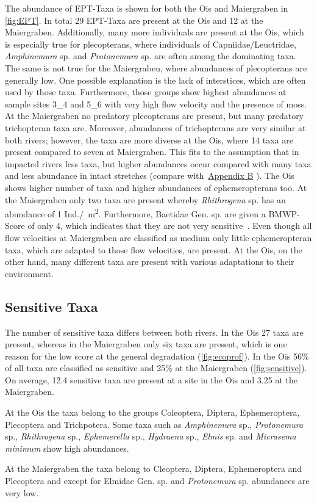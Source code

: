 The abundance of EPT-Taxa is shown for both the Ois and Maiergraben in \cref{fig:EPT}. In total 29 EPT-Taxa are present at the Ois and 12 at the Maiergraben. Additionally, many more individuals are present at the Ois, which is especially true for plecopterans, where individuals of Capniidae/Leuctridae, \emph{Amphinemura} sp. and \emph{Protonemura} sp. are often among the dominating taxa. The same is not true for the Maiergraben, where abundances of plecopterans are generally low. One possible explanation is the lack of interstices, which are often used by those taxa. Furthermore, those groups show highest abundances at sample sites 3\_4 and 5\_6 with very high flow velocity and the presence of moss. At the Maiergraben no predatory plecopterans are present, but many predatory trichopteran taxa are. Moreover, abundances of trichopterans are very similar at both rivers; however, the taxa are more diverse at the Ois, where 14 taxa are present compared to seven at Maiergraben. This fits to the assumption that in impacted rivers less taxa, but higher abundances occur compared with many taxa and less abundance in intact stretches (compare with~\hyperref[appendixB]{Appendix B} ). The Ois shows higher number of taxa and higher abundances of ephemeropterans too. At the Maiergraben only two taxa are present whereby \emph{Rhithrogena} sp. has an abundance of 1 Ind./\SI{}{\square\meter}. Furthermore, Baetidae Gen. sp. are given a BMWP-Score of only 4, which indicates that they are not very sensitive~. Even though all flow velocities at Maiergraben are classified as medium only little ephemeropteran taxa, which are adapted to those flow velocities, are present. At the Ois, on the other hand, many different taxa are present with various adaptations to their environment.



\subsection{Sensitive Taxa}\label{sec:disc_sensitive_taxa}          %

The number of sensitive taxa differs between both rivers. In the Ois 27 taxa are present, whereas in the Maiergraben only six taxa are present, which is one reason for the low score at the general degradation (\cref{fig:ecoprof}). In the Ois 56\% of all taxa are classified as sensitive and 25\% at the Maiergraben (\cref{fig:sensitive}). On average, 12.4 sensitive taxa are present at a site in the Ois and 3.25 at the Maiergraben.

At the Ois the taxa belong to the groups Coleoptera, Diptera, Ephemeroptera, Plecoptera and Trichpotera. Some taxa such as \emph{Amphinemura} sp., \emph{Protonemura} sp., \emph{Rhithrogena} sp., \emph{Ephemerella} sp., \emph{Hydraena} sp., \emph{Elmis} sp. and \emph{Micrasema minimum} show high abundances.

At the Maiergraben the taxa belong to Cleoptera, Diptera, Ephemeroptera and Plecoptera and except for Elmidae Gen. sp. and \emph{Protonemura} sp. abundances are very low.
